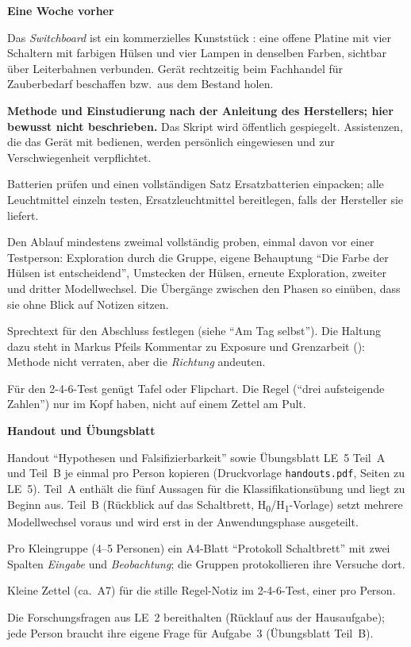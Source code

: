 \begin{vorbereitung}
\textbf{Eine Woche vorher}
\begin{checkliste}
  \item Das \emph{Switchboard} ist ein kommerzielles Kunststück
    \parencite{andersen2020switchboard}: eine offene Platine mit vier
    Schaltern mit farbigen Hülsen und vier Lampen in denselben Farben,
    sichtbar über Leiterbahnen verbunden. Gerät rechtzeitig beim
    Fachhandel für Zauberbedarf beschaffen bzw.\ aus dem Bestand holen.
  \item \textbf{Methode und Einstudierung nach der Anleitung des
    Herstellers; hier bewusst nicht beschrieben.} Das Skript wird
    öffentlich gespiegelt. Assistenzen, die das Gerät mit bedienen,
    werden persönlich eingewiesen und zur Verschwiegenheit verpflichtet.
  \item Batterien prüfen und einen vollständigen Satz Ersatzbatterien
    einpacken; alle Leuchtmittel einzeln testen, Ersatzleuchtmittel
    bereitlegen, falls der Hersteller sie liefert.
  \item Den Ablauf mindestens zweimal vollständig proben, einmal davon
    vor einer Testperson: Exploration durch die Gruppe, eigene
    Behauptung \enquote{Die Farbe der Hülsen ist entscheidend}, Umstecken
    der Hülsen, erneute Exploration, zweiter und dritter Modellwechsel.
    Die Übergänge zwischen den Phasen so einüben, dass sie ohne Blick auf
    Notizen sitzen.
  \item Sprechtext für den Abschluss festlegen (siehe \enquote{Am Tag
    selbst}). Die Haltung dazu steht in Markus Pfeils Kommentar zu
    Exposure und Grenzarbeit (): Methode nicht verraten,
    aber die \emph{Richtung} andeuten.
  \item Für den 2-4-6-Test genügt Tafel oder Flipchart. Die Regel
    (\enquote{drei aufsteigende Zahlen}) nur im Kopf haben, nicht auf
    einem Zettel am Pult.
\end{checkliste}

\textbf{Handout und Übungsblatt}
\begin{checkliste}
  \item Handout \enquote{Hypothesen und Falsifizierbarkeit} sowie
    Übungsblatt LE~5 Teil~A und Teil~B je einmal pro Person kopieren
    (Druckvorlage \texttt{handouts.pdf}, Seiten zu LE~5). Teil~A enthält
    die fünf Aussagen für die Klassifikationsübung und liegt zu Beginn
    aus. Teil~B (Rückblick auf das Schaltbrett,
    H\textsubscript{0}/H\textsubscript{1}-Vorlage) setzt mehrere
    Modellwechsel voraus und wird erst in der Anwendungsphase
    ausgeteilt.
  \item Pro Kleingruppe (4--5 Personen) ein A4-Blatt
    \enquote{Protokoll Schaltbrett} mit zwei Spalten \emph{Eingabe} und
    \emph{Beobachtung}; die Gruppen protokollieren ihre Versuche dort.
  \item Kleine Zettel (ca.\ A7) für die stille Regel-Notiz im
    2-4-6-Test, einer pro Person.
  \item Die Forschungsfragen aus LE~2 bereithalten (Rücklauf aus der
    Hausaufgabe); jede Person braucht ihre eigene Frage für Aufgabe~3
    (Übungsblatt Teil~B).
\end{checkliste}


\end{vorbereitung}
